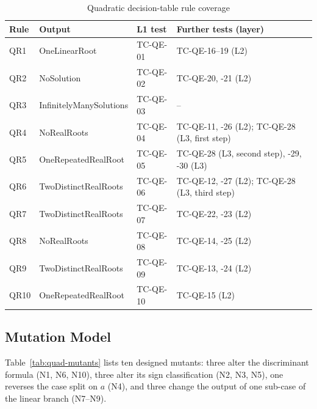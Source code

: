 \documentclass[11pt,a4paper]{article}
\begin{document}
\begin{table}[H]
\centering
\caption{Quadratic decision-table rule coverage}
\label{tab:quad-rule-coverage}
\small
\begin{tabularx}{\textwidth}{l l l Y}
\toprule
Rule & Output & L1 test & Further tests (layer) \\
\midrule
QR1 & OneLinearRoot & TC-QE-01 & TC-QE-16--19 (L2) \\
QR2 & NoSolution & TC-QE-02 & TC-QE-20, -21 (L2) \\
QR3 & InfinitelyManySolutions & TC-QE-03 & -- \\
QR4 & NoRealRoots & TC-QE-04 & TC-QE-11, -26 (L2); TC-QE-28 (L3, first step) \\
QR5 & OneRepeatedRealRoot & TC-QE-05 & TC-QE-28 (L3, second step), -29, -30 (L3) \\
QR6 & TwoDistinctRealRoots & TC-QE-06 & TC-QE-12, -27 (L2); TC-QE-28 (L3, third step) \\
QR7 & TwoDistinctRealRoots & TC-QE-07 & TC-QE-22, -23 (L2) \\
QR8 & NoRealRoots & TC-QE-08 & TC-QE-14, -25 (L2) \\
QR9 & TwoDistinctRealRoots & TC-QE-09 & TC-QE-13, -24 (L2) \\
QR10 & OneRepeatedRealRoot & TC-QE-10 & TC-QE-15 (L2) \\
\bottomrule
\end{tabularx}
\end{table}
\subsection{Mutation Model}
\label{sec:quad-mutants}

Table~\ref{tab:quad-mutants} lists ten designed mutants: three alter the
discriminant formula (N1, N6, N10), three alter its sign classification (N2,
N3, N5), one reverses the case split on \(a\) (N4), and three change the
output of one sub-case of the linear branch (N7--N9).
\end{document}
